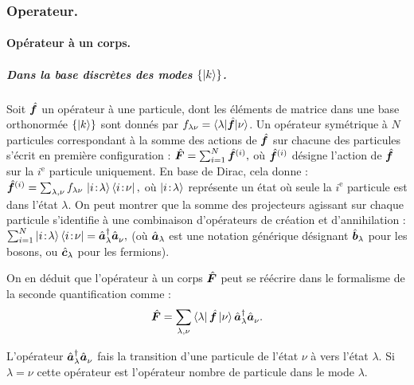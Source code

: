 \subsubsection{Operateur. }


\paragraph{Opérateur à un corps.}

\subparagraph{Dans la base discrètes des modes \( \{ \ket{k} \} \).}
Soit \( \hat{\bm{f}} \) un opérateur à une particule, dont les éléments de matrice dans une base orthonormée \( \{ \ket{k} \} \) sont donnés par \( f_{\lambda\nu} = \langle \lambda \vert \hat{\bm{f}} \vert \nu \rangle \). Un opérateur symétrique à \( N \) particules correspondant à la somme des actions de \( \hat{\bm{f}} \) sur chacune des particules s’écrit en première configuration  :
\(
	\hat{\bm{F}} = \sum_{i=1}^N \hat{\bm{f}}^{(i)},
\)
où \( \hat{\bm{f}}^{(i)} \) désigne l’action de \( \hat{\bm{f}} \) sur la $i^\text{e}$ particule uniquement. En base de Dirac, cela donne :
\(
	\hat{\bm{f}}^{(i)} = \sum_{\lambda, \nu} f_{\lambda\nu} \, \ket{i\!:\!\lambda} \bra{i\!:\!\nu},
\)
où \( \ket{i\!:\!\lambda} \) représente un état où seule la $i^\text{e}$ particule est dans l’état \( \lambda \). %
On peut montrer que la somme des projecteurs agissant sur chaque particule s’identifie à une combinaison d’opérateurs de création et d’annihilation :
\(
	\sum_{i=1}^N \ket{i\!:\!\lambda} \bra{i\!:\!\nu} = \hat{\bm{a}}^\dagger_\lambda \hat{\bm{a}}_\nu^{},
\)
(où \( \hat{\bm{a}}_\lambda \) est une notation générique désignant \( \hat{\bm{b}}_\lambda \) pour les bosons, ou \( \hat{\bm{c}}_\lambda \) pour les fermions).

On en déduit que l’opérateur à un corps \( \hat{\bm{F}} \) peut se réécrire dans le formalisme de la seconde quantification comme :
\begin{eqnarray}\label{chap.1:eq.rapel.opp.1.prim.1}
	\hat{\bm{F}} = \sum_{\lambda, \nu} \bra{\lambda} \hat{\bm{f}} \ket{\nu} \hat{\bm{a}}^\dagger_\lambda \hat{\bm{a}}_\nu^{}.
\end{eqnarray}

L'opérateur $\hat{\bm{a}}^\dagger_\lambda \hat{\bm{a}}_\nu^{}$ fais la transition d'une particule de l'état $\nu$ à vers l'état $\lambda$. Si $\lambda = \nu$ cette opérateur est l'opérateur nombre de particule dans le mode $\lambda$.

